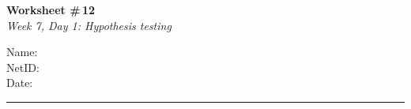 \documentclass[11pt]{article}
\begin{document}
\noindent
\begin{minipage}[t]{0.55\textwidth}
  \vspace{0pt}
  {\LARGE \textbf{Worksheet \#\,12}} \\[0.3em]
  {\large \textit{Week 7, Day 1: Hypothesis testing}}
\end{minipage}
\hfill
\begin{minipage}[t]{0.40\textwidth}
  \vspace{0pt}
  \begin{mdframed}[linecolor=black, linewidth=1pt, innertopmargin=10pt, innerbottommargin=10pt]
    \small
    \vspace{0.4cm}
    Name: \underline{\hspace{4.5cm}} \\[1em]
    NetID: \underline{\hspace{4.3cm}} \\[1em]
    Date: \underline{\hspace{4.4cm}} \\
  \end{mdframed}
\end{minipage}

\vspace{1em}
\noindent\rule{\linewidth}{1pt}
\vspace{0.2em}
\end{document}
